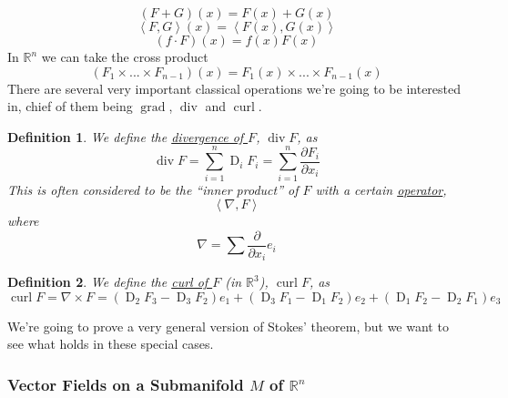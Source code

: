 \documentclass{article}
\newtheorem{definition}{Definition}
\DeclareMathOperator{\grad}{grad}
\DeclareMathOperator{\Div}{div}
\DeclareMathOperator{\curl}{curl}
\DeclareMathOperator{\D}{D}
\newcommand{\reals}[0]{\mathbb{R}}
\newcommand{\ip}[2]{\left\langle#1,#2\right\rangle}
\newcommand{\prt}[2]{\frac{\partial #1}{\partial #2}}
\begin{document}
\begin{equation}
  (F + G)(x) = F(x) + G(x)
\end{equation}
\begin{equation}
  \ip{F}{G}(x) = \ip{F(x)}{G(x)}
\end{equation}
\begin{equation}
  (f \cdot F)(x) = f(x)F(x)
\end{equation}
In \(\reals^n\) we can take the cross product
\begin{equation}
  (F_1 \times ... \times F_{n - 1})(x) = F_1(x) \times ... \times F_{n - 1}(x)
\end{equation}
There are several very important classical operations we're going to be interested in, chief of them being \(\grad\), \(\Div\) and \(\curl\).
\begin{definition}
 We define the \underline{divergence of \(F\)}, \(\Div F\), as
 \begin{equation}
  \Div F = \sum_{i = 1}^n\D_iF_i = \sum_{i = 1}^n\prt{F_i}{x_i}
 \end{equation}
 This is often considered to be the ``inner product'' of \(F\) with a certain \underline{operator},
 \begin{equation}
  \ip{\nabla}{F}
 \end{equation}
 where
 \begin{equation}
  \nabla = \sum\prt{}{x_i}e_i
 \end{equation}
\end{definition}
\begin{definition}
  We define the \underline{curl of \(F\)} (in \(\reals^3\)), \(\curl F\), as
  \begin{equation}
    \curl F = \nabla \times F = (\D_2F_3 - \D_3F_2)e_1 + (\D_3F_1 - \D_1F_2)e_2 + (\D_1F_2 - \D_2F_1)e_3
  \end{equation}
\end{definition}
We're going to prove a very general version of Stokes' theorem, but we want to see what holds in these special cases.

\subsubsection{Vector Fields on a Submanifold \(M\) of \(\reals^n\)}
\end{document}
